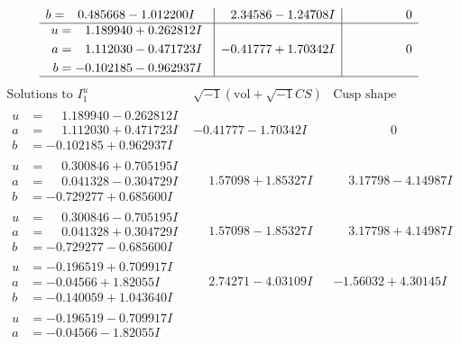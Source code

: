 \documentclass[1p]{elsarticle_modified}
\theoremstyle{definition}
\newcommand{\I}{\sqrt{-1}}
\begin{document}
$$\begin{array}{c|c|c}
\begin{aligned}
b &= \phantom{-}0.485668 - 1.012200 I\end{aligned}
 & \phantom{-}2.34586 - 1.24708 I & \phantom{-0.000000 } 0 \\ \hline\begin{aligned}
u &= \phantom{-}1.189940 + 0.262812 I \\
a &= \phantom{-}1.112030 - 0.471723 I \\
b &= -0.102185 - 0.962937 I\end{aligned}
 & -0.41777 + 1.70342 I & \phantom{-0.000000 } 0\\
 \hline 
 \end{array}$$\newpage$$\begin{array}{c|c|c}  
\text{Solutions to }I^u_{1}& \I (\text{vol} + \sqrt{-1}CS) & \text{Cusp shape}\\
 \hline 
\begin{aligned}
u &= \phantom{-}1.189940 - 0.262812 I \\
a &= \phantom{-}1.112030 + 0.471723 I \\
b &= -0.102185 + 0.962937 I\end{aligned}
 & -0.41777 - 1.70342 I & \phantom{-0.000000 } 0 \\ \hline\begin{aligned}
u &= \phantom{-}0.300846 + 0.705195 I \\
a &= \phantom{-}0.041328 - 0.304729 I \\
b &= -0.729277 + 0.685600 I\end{aligned}
 & \phantom{-}1.57098 + 1.85327 I & \phantom{-}3.17798 - 4.14987 I \\ \hline\begin{aligned}
u &= \phantom{-}0.300846 - 0.705195 I \\
a &= \phantom{-}0.041328 + 0.304729 I \\
b &= -0.729277 - 0.685600 I\end{aligned}
 & \phantom{-}1.57098 - 1.85327 I & \phantom{-}3.17798 + 4.14987 I \\ \hline\begin{aligned}
u &= -0.196519 + 0.709917 I \\
a &= -0.04566 + 1.82055 I \\
b &= -0.140059 + 1.043640 I\end{aligned}
 & \phantom{-}2.74271 - 4.03109 I & -1.56032 + 4.30145 I \\ \hline\begin{aligned}
u &= -0.196519 - 0.709917 I \\
a &= -0.04566 - 1.82055 I \\

\end{aligned}
\end{array}$$
\end{document}
